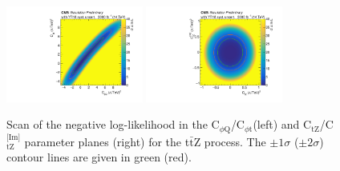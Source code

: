 \documentclass[letterpaper,11pt]{article}
\def\ttZ{t$\bar{\text{t}}$Z\xspace}
\def\ctZ{C$_\text{tZ}$\xspace}
\def\ctZI{C$_\text{tZ}^\text{[Im]}$\xspace}
\def\cpt{C$_{\phi \text{t}}$\xspace}
\def\cpQM{C$_{\phi \text{Q}}$\xspace}
\begin{document}
\begin{figure}[tbp]
  \centering
    \includegraphics[trim={0.4cm 0.3cm 0.8cm 0.cm},clip,width=0.4\textwidth]{Figures/cpQM_cpt_lumi3000_14TeV_CMScombine_r1_fullUnc.pdf}
    \hspace{1cm}
    \includegraphics[trim={0.4cm 0.3cm 0.8cm 0.cm},clip,width=0.4\textwidth]{Figures/ctZ_ctZI_lumi3000_14TeV_CMScombine_r1_fullUnc.pdf}
  \caption{Scan of the negative log-likelihood in the \cpQM/\cpt (left) and \ctZ/\ctZI parameter planes (right) for the \ttZ process. 
           The $\pm 1\sigma$ ($\pm 2\sigma$) contour lines are given in green (red).
           }
  \label{fig:ttZ_nll}
\end{figure}

\clearpage


\end{document}
